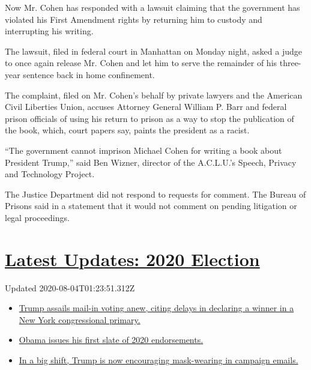 Now Mr. Cohen has responded with a lawsuit claiming that the government
has violated his First Amendment rights by returning him to custody and
interrupting his writing.

The lawsuit, filed in federal court in Manhattan on Monday night, asked
a judge to once again release Mr. Cohen and let him to serve the
remainder of his three-year sentence back in home confinement.

The complaint, filed on Mr. Cohen's behalf by private lawyers and the
American Civil Liberties Union, accuses Attorney General William P. Barr
and federal prison officials of using his return to prison as a way to
stop the publication of the book, which, court papers say, paints the
president as a racist.

``The government cannot imprison Michael Cohen for writing a book about
President Trump,'' said Ben Wizner, director of the A.C.L.U.'s Speech,
Privacy and Technology Project.

The Justice Department did not respond to requests for comment. The
Bureau of Prisons said in a statement that it would not comment on
pending litigation or legal proceedings.

\hypertarget{latest-updates-2020-election}{%
\section{\texorpdfstring{\href{https://www.nytimes3xbfgragh.onion/2020/08/03/us/elections/biden-vs-trump.html?action=click\&pgtype=Article\&state=default\&region=MAIN_CONTENT_1\&context=storylines_live_updates}{Latest
Updates: 2020
Election}}{Latest Updates: 2020 Election}}\label{latest-updates-2020-election}}

Updated 2020-08-04T01:23:51.312Z

\begin{itemize}
\tightlist
\item
  \href{https://www.nytimes3xbfgragh.onion/2020/08/03/us/elections/biden-vs-trump.html?action=click\&pgtype=Article\&state=default\&region=MAIN_CONTENT_1\&context=storylines_live_updates\#link-6494b448}{Trump
  assails mail-in voting anew, citing delays in declaring a winner in a
  New York congressional primary.}
\item
  \href{https://www.nytimes3xbfgragh.onion/2020/08/03/us/elections/biden-vs-trump.html?action=click\&pgtype=Article\&state=default\&region=MAIN_CONTENT_1\&context=storylines_live_updates\#link-3de249e6}{Obama
  issues his first slate of 2020 endorsements.}
\item
  \href{https://www.nytimes3xbfgragh.onion/2020/08/03/us/elections/biden-vs-trump.html?action=click\&pgtype=Article\&state=default\&region=MAIN_CONTENT_1\&context=storylines_live_updates\#link-54e34d20}{In
  a big shift, Trump is now encouraging mask-wearing in campaign
  emails.}
\end{itemize}

